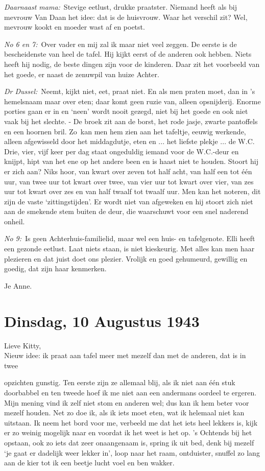 \documentclass{book}
\begin{document}
\emph{Daarnaast mama:}~Stevige eetlust, drukke praatster. Niemand heeft
als bij mevrouw Van Daan het idee: dat is de huisvrouw. Waar het
verschil zit? Wel, mevrouw kookt en moeder wast af en poetst.

\emph{No 6 en 7:}~Over vader en mij zal ik maar niet veel zeggen. De
eerste is de bescheidenste van heel de tafel. Hij kijkt eerst of de
anderen ook hebben. Niets heeft hij nodig, de beste dingen zijn voor de
kinderen. Daar zit het voorbeeld van het goede, er naast de zenuwpil van
huize Achter.

\emph{Dr Dussel:}~Neemt, kijkt niet, eet, praat niet. En als men praten
moet, dan in 's hemelsnaam maar over eten; daar komt geen ruzie van,
alleen opsnijderij. Enorme porties gaan er in en `neen' wordt nooit
gezegd, niet bij het goede en ook niet vaak bij het slechte. - De broek
zit aan de borst, het rode jasje, zwarte pantoffels en een hoornen bril.
Zo~kan men hem zien aan het tafeltje, eeuwig werkende, alleen
afgewisseld door het middagdutje, eten en ... het liefste plekje ... de
W.C. Drie, vier, vijf keer per dag staat ongeduldig iemand voor de
W.C.-deur en knijpt, hipt van het ene op het andere been en is haast
niet te houden. Stoort hij er zich aan? Niks hoor, van kwart over zeven
tot half acht, van half een tot één uur, van twee uur tot kwart over
twee, van vier uur tot kwart over vier, van zes uur tot kwart over zes
en van half twaalf tot twaalf uur. Men kan het noteren, dit zijn de
vaste `zittingstijden'. Er wordt niet van afgeweken en hij stoort zich
niet aan de smekende stem buiten de deur, die waarschuwt voor een snel
naderend onheil.

\emph{No 9:}~Is geen Achterhuis-familielid, maar wel een huis- en
tafelgenote. Elli heeft een gezonde eetlust. Laat niets staan, is niet
kieskeurig. Met alles kan men haar plezieren en dat juist doet ons
plezier. Vrolijk en goed gehumeurd, gewillig en goedig, dat zijn haar
kenmerken.

Je Anne.

\chapter{Dinsdag, 10 Augustus 1943}

Lieve Kitty,\\Nieuw idee: ik praat aan tafel meer met mezelf dan met de
anderen, dat is in twee

opzichten gunstig. Ten eerste zijn ze allemaal blij, als ik niet aan één
stuk doorbabbel en ten tweede hoef ik me niet aan een andermans oordeel
te ergeren. Mijn mening vind ik zelf niet stom en anderen wel; dus kan
ik hem beter voor mezelf houden. Net zo doe ik, als ik iets moet eten,
wat ik helemaal niet kan uitstaan. Ik neem het bord voor me, verbeeld me
dat het iets heel lekkers is, kijk er zo weinig mogelijk naar en voordat
ik het weet is het op. 's Ochtends bij het opstaan, ook zo iets dat zeer
onaangenaam is, spring ik uit bed, denk bij mezelf `je gaat er dadelijk
weer lekker in', loop naar het raam, ontduister, snuffel zo lang aan de
kier tot ik een beetje lucht voel en ben wakker.
\end{document}
